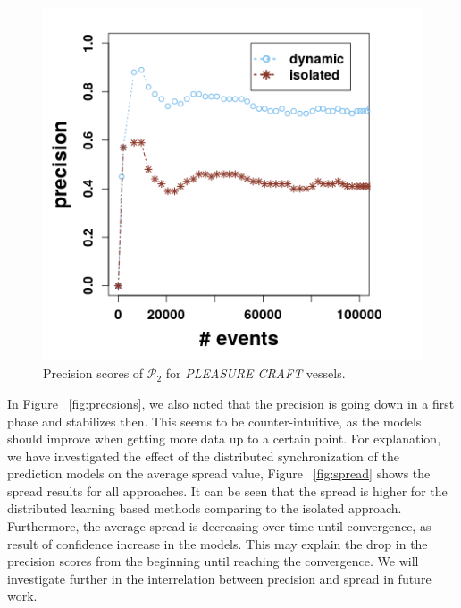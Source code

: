  \begin{figure}[h]
	
	\includegraphics[width=.5\textwidth]{figures/precision_p2.png}
	
	\caption{Precision scores of $\mathcal{P}_2$  for \textit{PLEASURE CRAFT} vessels.}
	\label{fig:precsions_p2}
\end{figure}

\par In Figure ~\ref{fig:precsions}, we also noted that the precision is going down in a first phase and stabilizes then. This seems to be counter-intuitive, as the models should improve when getting more data up to a certain point. For explanation, we have investigated the effect of the distributed synchronization of the prediction models on the average spread value, Figure  ~\ref{fig:spread}  shows the spread results for all approaches. It can be seen that the spread is higher for the distributed learning based methods comparing to the isolated approach. Furthermore, the average spread is decreasing over time until convergence, as result of confidence increase in the models. This may explain the drop in the precision scores from the beginning until reaching the convergence. We will investigate further in the interrelation between precision and spread in future work. 



